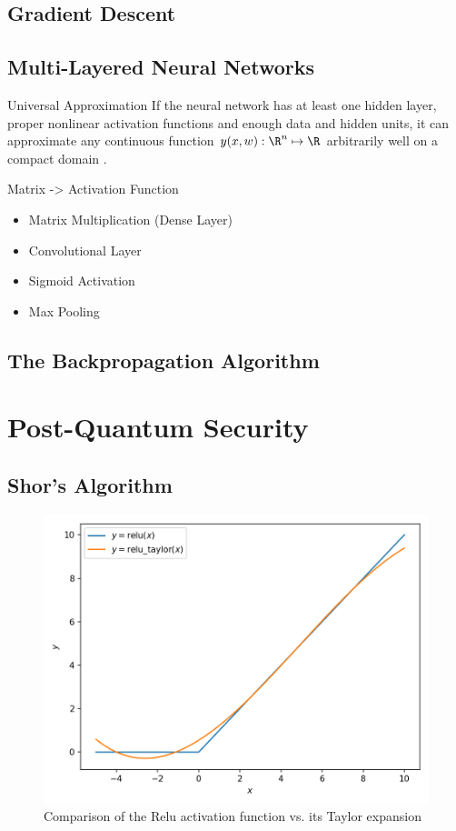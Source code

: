 \subsection{Gradient Descent}
\subsection{Multi-Layered Neural Networks}

\begin{theorem}{Universal Approximation}
  If the neural network has at least one hidden layer, proper nonlinear activation functions and enough
  data and hidden units, it can approximate any continuous function $y(x, w): \R^n \mapsto \R$
  arbitrarily well on a compact domain
  \parencite{1989-HornikMultilayerFN}.
\end{theorem}

Matrix -> Activation Function
\begin{itemize}
  \item Matrix Multiplication (Dense Layer)
  \item Convolutional Layer
  \item Sigmoid Activation
  \item Max Pooling
\end{itemize}

\subsection{The Backpropagation Algorithm}

\section{Post-Quantum Security}
\label{sec:post-quantum-sec}
\subsection{Shor's Algorithm}

\begin{figure}[H]
  \centering
  \includegraphics[width=0.8\linewidth]{figures/taylor-relu.png}
  \caption{Comparison of the Relu activation function vs. its Taylor expansion}
\end{figure}
